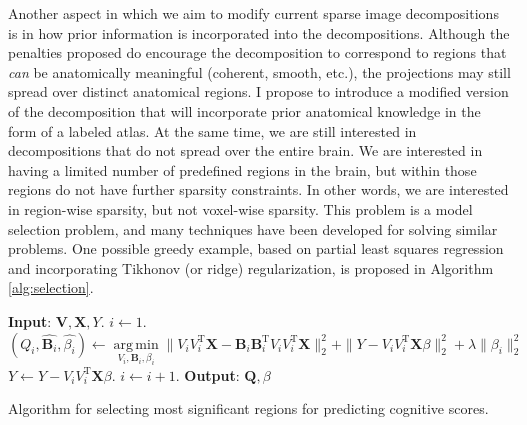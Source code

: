 \documentclass[11pt]{nih}
\begin{document}
Another aspect in which we aim to modify current sparse image decompositions is in how prior information is incorporated into the decompositions. Although the penalties proposed do encourage the decomposition to correspond to regions that \textit{can} be anatomically meaningful (coherent, smooth, etc.), the projections may still spread over distinct anatomical regions.  I propose to introduce a modified version of the decomposition that will incorporate prior anatomical knowledge in the form of a labeled atlas.  At the same time, we are still interested in decompositions that do not spread over the entire brain.  We are interested in having a limited number of predefined regions in the brain, but within those regions do not have further sparsity constraints.   In other words, we are interested in region-wise sparsity, but not voxel-wise sparsity.  This problem is a model selection problem, and many techniques have been developed for solving similar problems.  One possible greedy example, based on partial least squares regression and incorporating Tikhonov (or ridge) regularization, is proposed in Algorithm \ref{alg:selection}.  

\begin{algorithm}
\begin{algorithmic}
\State \textbf{Input}: $\mathbf{V},\mathbf{X},Y$. 
\State $i \leftarrow 1$.  
\State $\left(Q_i, \hat{\mathbf{B}_i}, \hat{\beta_i} \right) \leftarrow \underset{V_i, \mathbf{B}_i, \beta_i}{\operatorname{arg\,min}} \| V_i V_i^{\mathrm{T}} \mathbf{X} - \mathbf{B}_i \mathbf{B}_i^{\mathrm{T}} V_i V_i^{\mathrm{T}} \mathbf{X}  \|_2^2 + \|Y - V_i V_i^{\mathrm{T}} \mathbf{X} \beta \|_2^2 + \lambda \|\beta_i\|_2^2 $  
\State $Y \leftarrow Y - V_i V_i^{\mathrm{T}} \mathbf{X} \beta$. 
\State $i \leftarrow i + 1$. 
\EndWhile
\State \textbf{Output}: $\mathbf{Q}, \beta$ 
\end{algorithmic}
\caption{Algorithm for selecting most significant regions for predicting cognitive scores.}
\label{alg:selection}
\end{algorithm}
\end{document}
